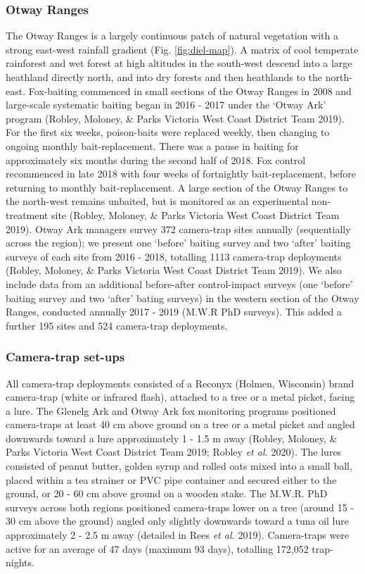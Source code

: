 \documentclass[]{elsarticle} %
\begin{document}
\hypertarget{otway-ranges}{%
\subsubsection{Otway Ranges}\label{otway-ranges}}

The Otway Ranges is a largely continuous patch of natural vegetation with a strong east-west rainfall gradient (Fig. \ref{fig:diel-map}). A matrix of cool temperate rainforest and wet forest at high altitudes in the south-west descend into a large heathland directly north, and into dry forests and then heathlands to the north-east. Fox-baiting commenced in small sections of the Otway Ranges in 2008 and large-scale systematic baiting began in 2016 - 2017 under the `Otway Ark' program (Robley, Moloney, \& Parks Victoria West Coast District Team 2019). For the first six weeks, poison-baits were replaced weekly, then changing to ongoing monthly bait-replacement. There was a pause in baiting for approximately six months during the second half of 2018. Fox control recommenced in late 2018 with four weeks of fortnightly bait-replacement, before returning to monthly bait-replacement. A large section of the Otway Ranges to the north-west remains unbaited, but is monitored as an experimental non-treatment site (Robley, Moloney, \& Parks Victoria West Coast District Team 2019). Otway Ark managers survey 372 camera-trap sites annually (sequentially across the region); we present one `before' baiting survey and two `after' baiting surveys of each site from 2016 - 2018, totalling 1113 camera-trap deployments (Robley, Moloney, \& Parks Victoria West Coast District Team 2019). We also include data from an additional before-after control-impact surveys (one `before' baiting survey and two `after' bating surveys) in the western section of the Otway Ranges, conducted annually 2017 - 2019 (M.W.R PhD surveys). This added a further 195 sites and 524 camera-trap deployments.

\hypertarget{camera-trap-set-ups}{%
\subsubsection{Camera-trap set-ups}\label{camera-trap-set-ups}}

All camera-trap deployments consisted of a Reconyx (Holmen, Wisconsin) brand camera-trap (white or infrared flash), attached to a tree or a metal picket, facing a lure. The Glenelg Ark and Otway Ark fox monitoring programs positioned camera-traps at least 40 cm above ground on a tree or a metal picket and angled downwards toward a lure approximately 1 - 1.5 m away (Robley, Moloney, \& Parks Victoria West Coast District Team 2019; Robley \emph{et al.} 2020). The lures consisted of peanut butter, golden syrup and rolled oats mixed into a small ball, placed within a tea strainer or PVC pipe container and secured either to the ground, or 20 - 60 cm above ground on a wooden stake. The M.W.R. PhD surveys across both regions positioned camera-traps lower on a tree (around 15 - 30 cm above the ground) angled only slightly downwards toward a tuna oil lure approximately 2 - 2.5 m away (detailed in Rees \emph{et al.} 2019). Camera-traps were active for an average of 47 days (maximum 93 days), totalling 172,052 trap-nights.
\end{document}
